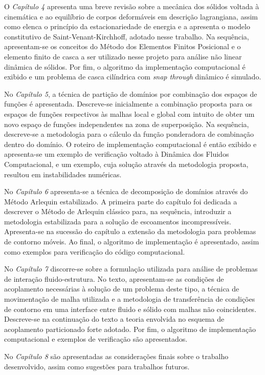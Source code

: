O \textit{Capítulo 4} apresenta uma breve revisão sobre a mecânica dos sólidos voltada à cinemática e ao equilíbrio de corpos deformáveis em descrição lagrangiana, assim como elenca o princípio da estacionariedade de energia e a apresenta o modelo constitutivo de Saint-Venant-Kirchhoff, adotado nesse trabalho. Na sequência, apresentam-se os conceitos do Método dos Elementos Finitos Posicional e o elemento finito de casca a ser utilizado nesse projeto para análise não linear dinâmica de sólidos. Por fim, o algoritmo da implementação computacional é exibido e um problema de casca cilíndrica com \textit{snap through} dinâmico é simulado.

No \textit{Capítulo 5}, a técnica de partição de domínios por combinação dos espaços de funções é apresentada.  Descreve-se inicialmente a combinação proposta para os espaços de funções respectivos às malhas local e global com intuito de obter um novo espaço de funções independentes na zona de superposição. Na sequência, descreve-se a metodologia para o cálculo da função ponderadora de combinação dentro do domínio. O roteiro de implementação computacional é então exibido e apresenta-se um exemplo de verificação voltado à Dinâmica dos Fluidos Computacional, e um exemplo, cuja solução através da metodologia proposta, resultou em instabilidades numéricas.

No \textit{Capítulo 6} apresenta-se a técnica de decomposição de domínios através do Método Arlequin estabilizado. A primeira parte do capítulo foi dedicada a descrever o Método de Arlequin clássico para, na sequência, introduzir a metodologia estabilizada para a solução de escoamentos incompressíveis. Apresenta-se na sucessão do capítulo a extensão da metodologia para problemas de contorno móveis. Ao final, o algoritmo de implementação é apresentado, assim como exemplos para verificação do código computacional.

No \textit{Capítulo 7} discorre-se sobre a formulação utilizada para análise de problemas de interação fluido-estrutura. No texto, apresentam-se as condições de acoplamento necessárias à solução de um problema deste tipo, a técnica de movimentação de malha utilizada e a metodologia de transferência de condições de contorno em uma interface entre fluido e sólido com malhas não coincidentes. Descreve-se na continuação do texto a teoria envolvida no esquema de acoplamento particionado forte adotado. Por fim, o algoritmo de implementação computacional e exemplos de verificação são apresentados.

No \textit{Capítulo 8} são apresentadas as considerações finais sobre o trabalho desenvolvido, assim como sugestões para trabalhos futuros. 

